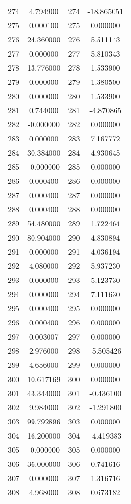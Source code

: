 \documentclass[12pt]{article}
\begin{document}
\begin{longtable}{@{}cccc@{}}
274 & 4.794900 & 274 & -18.865051 \\
275 & 0.000100 & 275 & 0.000000 \\
276 & 24.360000 & 276 & 5.511143 \\
277 & 0.000000 & 277 & 5.810343 \\
278 & 13.776000 & 278 & 1.533900 \\
279 & 0.000000 & 279 & 1.380500 \\
280 & 0.000000 & 280 & 1.533900 \\
281 & 0.744000 & 281 & -4.870865 \\
282 & -0.000000 & 282 & 0.000000 \\
283 & 0.000000 & 283 & 7.167772 \\
284 & 30.384000 & 284 & 4.930645 \\
285 & -0.000000 & 285 & 0.000000 \\
286 & 0.000400 & 286 & 0.000000 \\
287 & 0.000400 & 287 & 0.000000 \\
288 & 0.000400 & 288 & 0.000000 \\
289 & 54.480000 & 289 & 1.722464 \\
290 & 80.904000 & 290 & 4.830894 \\
291 & 0.000000 & 291 & 4.036194 \\
292 & 4.080000 & 292 & 5.937230 \\
293 & 0.000000 & 293 & 5.123730 \\
294 & 0.000000 & 294 & 7.111630 \\
295 & 0.000400 & 295 & 0.000000 \\
296 & 0.000400 & 296 & 0.000000 \\
297 & 0.003007 & 297 & 0.000000 \\
298 & 2.976000 & 298 & -5.505426 \\
299 & 4.656000 & 299 & 0.000000 \\
300 & 10.617169 & 300 & 0.000000 \\
301 & 43.344000 & 301 & -0.436100 \\
302 & 9.984000 & 302 & -1.291800 \\
303 & 99.792896 & 303 & 0.000000 \\
304 & 16.200000 & 304 & -4.419383 \\
305 & -0.000000 & 305 & 0.000000 \\
306 & 36.000000 & 306 & 0.741616 \\
307 & 0.000000 & 307 & 1.316716 \\
308 & 4.968000 & 308 & 0.673182 \\

\end{longtable}
\end{document}
